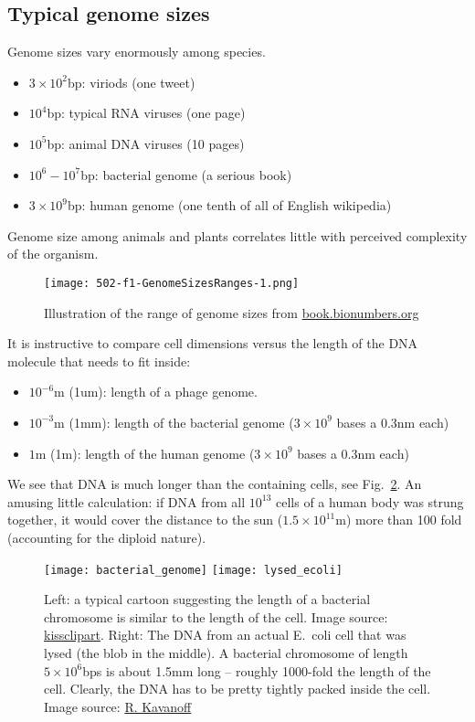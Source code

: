 \subsection{Typical genome sizes}
Genome sizes vary enormously among species.

\begin{itemize}
  \item $3\times 10^{2}$bp: viriods (one tweet)
  \item $10^{4}$bp: typical RNA viruses (one page)
  \item $10^{5}$bp: animal DNA viruses (10 pages)
  \item $10^{6}-10^{7}$bp: bacterial genome (a serious book)
  \item $3\times 10^{9}$bp: human genome (one tenth of all of English wikipedia)
\end{itemize}

Genome size among animals and plants correlates little with perceived complexity of the organism.


\begin{figure}[h]
	\centering
	\texttt{[image: 502-f1-GenomeSizesRanges-1.png]}
	\caption{Illustration of the range of genome sizes from \href{http://book.bionumbers.org/size-and-geometry-introduction/}{book.bionumbers.org}}
	\label{fig:genome_sizes}
\end{figure}

It is instructive to compare cell dimensions versus the length of the DNA molecule that needs to fit inside:
\begin{itemize}
  \item $10^{-6}$m (1um): length of a phage genome.
  \item $10^{-3}$m (1mm): length of the bacterial genome ($3\times 10^9$ bases a 0.3nm each)
  \item $1$m (1m): length of the human genome ($3\times 10^9$ bases a 0.3nm each)
\end{itemize}

We see that DNA is much longer than the containing cells, see Fig.~\ref{fig:DNA_packing_illustration}.
An amusing little calculation: if DNA from all $10^{13}$ cells of a human body was strung together, it would cover the distance to the sun ($1.5\times 10^{11}$m) more than 100 fold (accounting for the diploid nature).

\begin{figure}[tb]
	\centering
	\texttt{[image: bacterial\_genome]}
	\texttt{[image: lysed\_ecoli]}
	\caption{Left: a typical cartoon suggesting the length of a bacterial chromosome is similar to the length of the cell. Image source: \href{https://www.kissclipart.com/bacterial-genome-clipart-plasmid-genome-bacteria-dt3adi/}{kissclipart}.
	Right: The DNA from an actual E.~coli cell that was lysed (the blob in the middle). A bacterial chromosome of length $5\times 10^6$bps is about 1.5mm long -- roughly 1000-fold the length of the cell.  Clearly, the DNA has to be pretty tightly packed inside the cell. Image source: \href{https://www.nature.com/scitable/content/supercoiled-chromosome-of-e-coli-44517/}{R. Kavanoff}}
	\label{fig:DNA_packing_illustration}
\end{figure}


